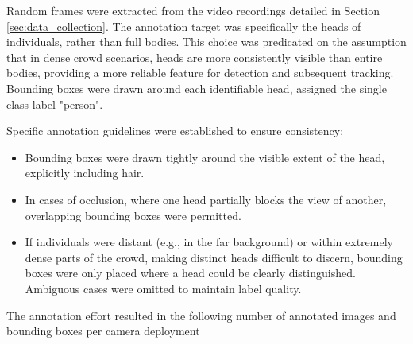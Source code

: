 Random frames were extracted from the video recordings detailed in Section \ref{sec:data_collection}. The annotation target was specifically the heads of individuals, rather than full bodies. This choice was predicated on the assumption that in dense crowd scenarios, heads are more consistently visible than entire bodies, providing a more reliable feature for detection and subsequent tracking. Bounding boxes were drawn around each identifiable head, assigned the single class label "person".

Specific annotation guidelines were established to ensure consistency:
\begin{itemize}
  \item Bounding boxes were drawn tightly around the visible extent of the head, explicitly including hair.
  \item In cases of occlusion, where one head partially blocks the view of another, overlapping bounding boxes were permitted.
  \item If individuals were distant (e.g., in the far background) or within extremely dense parts of the crowd, making distinct heads difficult to discern, bounding boxes were only placed where a head could be clearly distinguished. Ambiguous cases were omitted to maintain label quality.
\end{itemize}

The annotation effort resulted in the following number of annotated images and bounding boxes per camera deployment


